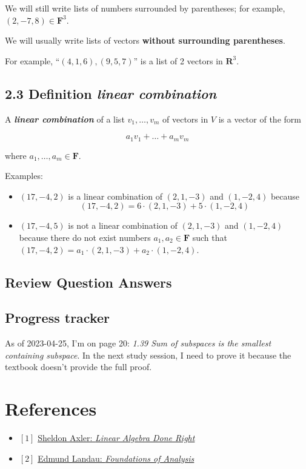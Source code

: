 \documentclass[12pt, letterpaper, oneside]{book}
\begin{document}
We will still write lists of numbers surrounded by parentheses; for example,
$(2, -7, 8) \in \mathbf{F}^3$.

We will usually write lists of vectors \textbf{without surrounding parentheses}.

For example, ``$(4, 1, 6), (9, 5, 7)$'' is a list of 2 vectors in
$\mathbf{R}^3$.

\section{2.3 Definition \textbf{\textit{linear combination}}}

A \textbf{\textit{linear combination}} of a list $v_1, \ldots, v_m$ of vectors
in $V$ is a vector of the form

\[
  a_1v_1 + \dots + a_mv_m
\]

where $a_1, \ldots, a_m \in \mathbf{F}$.

Examples:

\begin{itemize}
  \item $(17, -4, 2)$ is a linear combination of $(2, 1, -3)$ and $(1, -2, 4)$
    because
    \[
      (17, -4, 2) = 6 \cdot (2, 1, -3) + 5 \cdot (1, -2, 4)
    \]
  \item $(17, -4, 5)$ is not a linear combination of $(2, 1, -3)$ and
    $(1, -2, 4)$ because there do not exist numbers $a_1, a_2 \in \mathbf{F}$
    such that $(17, -4, 2) = a_1 \cdot (2, 1, -3) + a_2 \cdot (1, -2, 4)$.
\end{itemize}

\section{Review Question Answers}

\section{Progress tracker}

As of 2023-04-25, I'm on page 20: \textit{1.39 Sum of subspaces is the smallest
containing subspace}. In the next study session, I need to prove it because the
textbook doesn't provide the full proof.

\chapter*{References}

\begin{itemize}
  \item $[1]$ \href{https://linear.axler.net/}{Sheldon Axler: \it{Linear Algebra Done Right}}
  \item $[2]$ \href{https://bookstore.ams.org/view?ProductCode=CHEL/79}{Edmund Landau: \it{Foundations of Analysis}}
\end{itemize}
\end{document}

